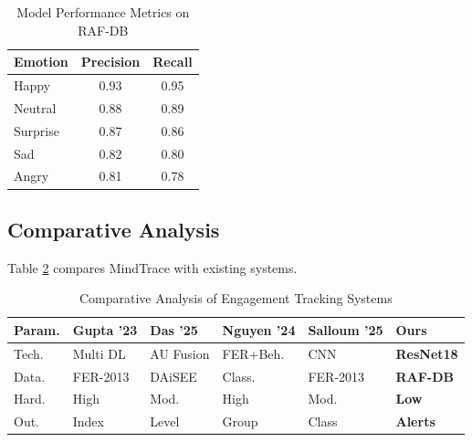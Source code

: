 \documentclass[conference]{IEEEtran}
\begin{document}
\begin{table}[h]
    \centering
    \caption{Model Performance Metrics on RAF-DB}
    \label{tab:metrics}
    \fontsize{10}{12}\selectfont
    \begin{tabular}{lcc}
        \toprule
        \textbf{Emotion} & \textbf{Precision} & \textbf{Recall} \\
        \midrule
        Happy & 0.93 & 0.95 \\
        Neutral & 0.88 & 0.89 \\
        Surprise & 0.87 & 0.86 \\
        Sad & 0.82 & 0.80 \\
        Angry & 0.81 & 0.78 \\
        \bottomrule
    \end{tabular}
\end{table}

\subsection{Comparative Analysis}
Table \ref{tab:comparative} compares MindTrace with existing systems.

\begin{table}[h!]
    \centering
    \caption{Comparative Analysis of Engagement Tracking Systems}
    \label{tab:comparative}
    \fontsize{7}{8.5}\selectfont
    \begin{tabularx}{\columnwidth}{@{}lXXXXX@{}}
        \toprule
        \textbf{Param.} & \textbf{Gupta '23} & \textbf{Das '25} & \textbf{Nguyen '24} & \textbf{Salloum '25} & \textbf{Ours} \\
        \midrule
        Tech. & Multi DL & AU Fusion & FER+Beh. & CNN & \textbf{ResNet18} \\
        Data. & FER-2013 & DAiSEE & Class. & FER-2013 & \textbf{RAF-DB} \\
        Hard. & High & Mod. & High & Mod. & \textbf{Low} \\
        Out. & Index & Level & Group & Class & \textbf{Alerts} \\
        \bottomrule
    \end{tabularx}
\end{table}
\end{document}
